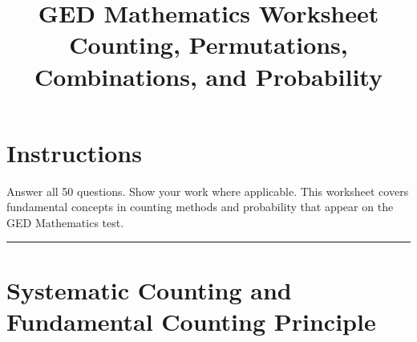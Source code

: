 \documentclass[12pt]{article}
\title{\Large \textbf{GED Mathematics Worksheet} \\ Counting, Permutations, Combinations, and Probability}
\author{}
\date{}
\begin{document}
\maketitle

\section*{Instructions}
Answer all 50 questions. Show your work where applicable. This worksheet covers fundamental concepts in counting methods and probability that appear on the GED Mathematics test.

\vspace{0.5cm}
\noindent\rule{\textwidth}{1pt}

\section{Systematic Counting and Fundamental Counting Principle}
\end{document}
